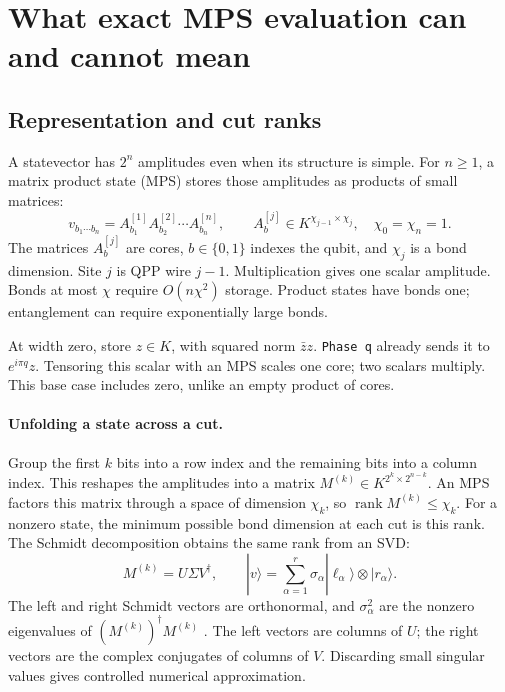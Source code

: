 \documentclass[11pt,a4paper]{article}
\newcommand{\code}[1]{\texttt{#1}}
\newcommand{\ket}[1]{|#1\rangle}
\DeclareMathOperator{\rank}{rank}
\begin{document}
\section{What exact MPS evaluation can and cannot mean}
\label{sec:mps}
\subsection{Representation and cut ranks}
A statevector has $2^n$ amplitudes even when its structure is simple.
For $n\ge1$, a matrix product state (MPS) stores those amplitudes as
products of small matrices:
\begin{equation}
v_{b_1\cdots b_n}
 =A^{[1]}_{b_1}A^{[2]}_{b_2}\cdots A^{[n]}_{b_n},
\qquad
A^{[j]}_b\in K^{\chi_{j-1}\times\chi_j},\quad \chi_0=\chi_n=1.
\label{eq:mps}
\end{equation}
The matrices $A^{[j]}_b$ are cores, $b\in\{0,1\}$ indexes the qubit,
and $\chi_j$ is a bond dimension. Site $j$ is QPP wire $j-1$.
Multiplication gives one scalar amplitude. Bonds at most $\chi$ require
$O(n\chi^2)$ storage. Product states have bonds one; entanglement can
require exponentially large bonds.

At width zero, store $z\in K$, with squared norm $\bar z z$.
\code{Phase q} already sends it to $e^{i\pi q}z$.
Tensoring this scalar with an MPS scales one core; two scalars multiply.
This base case includes zero, unlike an empty product of cores.

\paragraph{Unfolding a state across a cut.}
Group the first $k$ bits into a row index and the remaining bits into a
column index. This reshapes the amplitudes into a matrix
$M^{(k)}\in K^{2^k\times2^{n-k}}$.
An MPS factors this matrix through a space of dimension $\chi_k$,
so $\rank M^{(k)}\le\chi_k$. For a nonzero state, the minimum possible
bond dimension at each cut is this rank.
The Schmidt decomposition obtains the same rank from an SVD:
\[
M^{(k)}=U\Sigma V^\dagger,\qquad
\ket v=\sum_{\alpha=1}^{r}\sigma_\alpha
       \ket{\ell_\alpha}\otimes\ket{r_\alpha}.
\]
The left and right Schmidt vectors are orthonormal, and
$\sigma_\alpha^2$ are the nonzero eigenvalues of
$(M^{(k)})^\dagger M^{(k)}$ \cite{schollwock}.
The left vectors are columns of $U$; the right vectors are the
complex conjugates of columns of $V$.
Discarding small singular values gives controlled numerical approximation.
\end{document}
